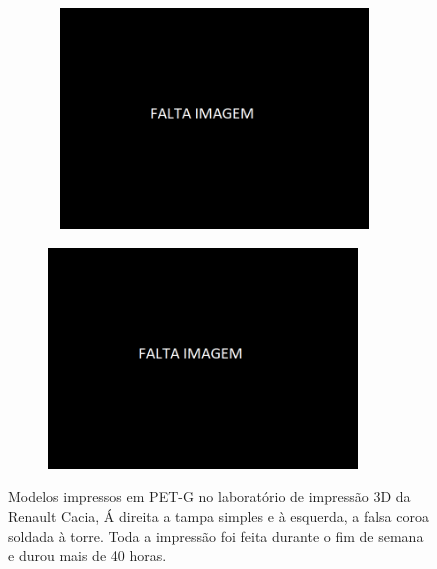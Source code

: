 \begin{figure}[htb]
    \centering
    \begin{subfigure}{.5\textwidth}\
        \centering
        \includegraphics[width = 0.9\textwidth]{Figures/Cap3/Falta_Imagem.png}
        \caption{}
        \label{fig:Tampa_simples_3d}
    \end{subfigure}%
    \begin{subfigure}{.5\textwidth}
        \centering
        \includegraphics[width = 0.9\textwidth]{Figures/Cap3/Falta_Imagem.png}
        \caption{}
        \label{fig:falsa_coroa_torre_3d}
    \end{subfigure}
    \caption[Modelos dos componentes modificados impressos em PET-G.]%
    {Modelos impressos em PET-G no laboratório de impressão 3D da Renault Cacia, Á direita a tampa simples e à esquerda, a falsa coroa soldada à torre. Toda a impressão foi feita durante o fim de semana e durou mais de 40 horas.}
\end{figure}
